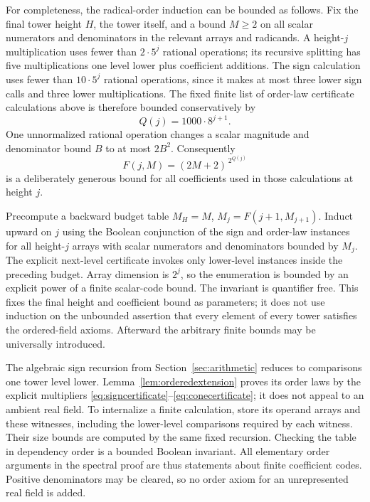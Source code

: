 \documentclass[11pt,a4paper]{article}
\theoremstyle{definition}
\begin{document}
For completeness, the radical-order induction can be bounded as follows.
Fix the final tower height \(H\), the tower itself, and a bound \(M\ge2\)
on all scalar numerators and denominators in the relevant arrays and
radicands. A height-\(j\) multiplication uses fewer than \(2\cdot5^j\)
rational operations; its recursive splitting has five multiplications
one level lower plus coefficient additions. The sign calculation uses
fewer than \(10\cdot5^j\) rational operations, since it makes at most
three lower sign calls and three lower multiplications.
The fixed finite list of order-law certificate calculations above is
therefore bounded conservatively by
\[
 Q(j)=1000\cdot8^{j+1}.
\]
One unnormalized rational operation changes a scalar magnitude and
denominator bound \(B\) to at most \(2B^2\). Consequently
\[
 F(j,M)=(2M+2)^{\,2^{Q(j)}}
 \tag{11.1}\label{eq:majorant}
\]
is a deliberately generous bound for all coefficients used in those
calculations at height \(j\).

Precompute a backward budget table
\(M_H=M\), \(M_j=F(j+1,M_{j+1})\). Induct upward on \(j\) using the
Boolean conjunction of the sign and order-law instances for all
height-\(j\) arrays with scalar numerators and denominators bounded by
\(M_j\). The explicit next-level certificate invokes only lower-level
instances inside the preceding budget. Array dimension is \(2^j\),
so the enumeration is bounded by an explicit power of a finite
scalar-code bound. The invariant is quantifier free.
This fixes the final height and coefficient bound as parameters;
it does not use induction on the unbounded assertion that every
element of every tower satisfies the ordered-field axioms.
Afterward the arbitrary finite bounds may be universally introduced.

The algebraic sign recursion from Section~\ref{sec:arithmetic} reduces
to comparisons one tower level lower. Lemma~\ref{lem:orderedextension}
proves its order laws by the explicit multipliers
\eqref{eq:signcertificate}--\eqref{eq:conecertificate}; it does not
appeal to an ambient real field. To internalize a finite calculation,
store its operand arrays and these witnesses, including the
lower-level comparisons required by each witness. Their size bounds
are computed by the same fixed recursion. Checking the table in
dependency order is a bounded Boolean invariant.
All elementary order arguments in the spectral proof are thus
statements about finite coefficient codes. Positive
denominators may be cleared, so no order axiom for an unrepresented
real field is added.
\end{document}
